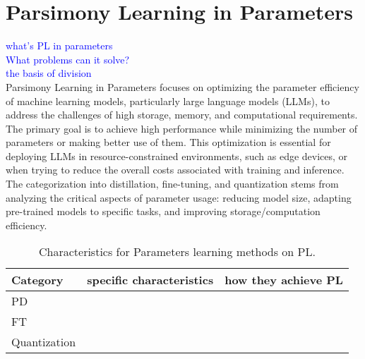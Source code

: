 \section{Parsimony Learning in Parameters}
\textcolor{blue}{what's PL in parameters}\\
\textcolor{blue}{What problems can it solve?}\\
\textcolor{blue}{the basis of division}\\
Parsimony Learning in Parameters focuses on optimizing the parameter efficiency of machine learning models, particularly large language models (LLMs), to address the challenges of high storage, memory, and computational requirements. The primary goal is to achieve high performance while minimizing the number of parameters or making better use of them. This optimization is essential for deploying LLMs in resource-constrained environments, such as edge devices, or when trying to reduce the overall costs associated with training and inference. The categorization into distillation, fine-tuning, and quantization stems from analyzing the critical aspects of parameter usage: reducing model size, adapting pre-trained models to specific tasks, and improving storage/computation efficiency.

\begin{table}[t]
\footnotesize
\centering
\tabcolsep=2pt
\caption{Characteristics for Parameters learning methods on PL.}
\begin{tabular}{l|c|c}
\toprule
Category &specific characteristics &how they achieve PL \\
\midrule
PD & &\\
\midrule
FT & &\\
\midrule
Quantization & & \\
\bottomrule
\end{tabular}
\label{table4}
\end{table}

